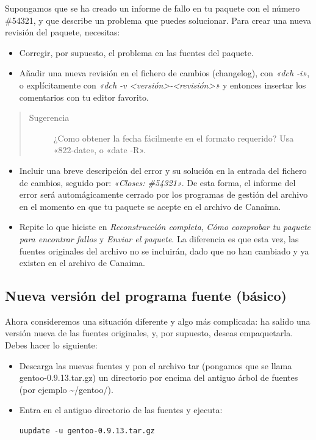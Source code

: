 \documentclass[letterpaper,12pt,spanish]{manual}
\begin{document}
Supongamos que se ha creado un informe de fallo en tu paquete con el número \#54321, y que describe un problema que puedes solucionar. Para crear una nueva revisión del paquete, necesitas:
\begin{itemize}
\item {} 
Corregir, por supuesto, el problema en las fuentes del paquete.

\item {} 
Añadir una nueva revisión en el fichero de cambios (changelog), con \emph{«dch -i»}, o explícitamente con \emph{«dch -v \textless{}versión\textgreater{}-\textless{}revisión\textgreater{}»} y entonces insertar los comentarios con tu editor favorito.

\end{itemize}
\begin{quote}\begin{description}
\item[{Sugerencia}] \leavevmode
¿Como obtener la fecha fácilmente en el formato requerido? Usa «822-date», o «date -R».

\end{description}\end{quote}
\begin{itemize}
\item {} 
Incluir una breve descripción del error y su solución en la entrada del fichero de cambios, seguido por: \emph{«Closes: \#54321»}. De esta forma, el informe del error será automágicamente cerrado por los programas de gestión del archivo en el momento en que tu paquete se acepte en el archivo de Canaima.

\item {} 
Repite lo que hiciste en \emph{Reconstrucción completa}, \emph{Cómo comprobar tu paquete para encontrar fallos} y \emph{Enviar el paquete}. La diferencia es que esta vez, las fuentes originales del archivo no se incluirán, dado que no han cambiado y ya existen en el archivo de Canaima.

\end{itemize}


\subsection{Nueva versión del programa fuente (básico)}

Ahora consideremos una situación diferente y algo más complicada: ha salido una versión nueva de las fuentes originales, y, por supuesto, deseas empaquetarla. Debes hacer lo siguiente:
\begin{itemize}
\item {} 
Descarga las nuevas fuentes y pon el archivo tar (pongamos que se llama gentoo-0.9.13.tar.gz) un directorio por encima del antiguo árbol de fuentes (por ejemplo \textasciitilde{}/gentoo/).

\item {} 
Entra en el antiguo directorio de las fuentes y ejecuta:

\begin{Verbatim}[commandchars=@\[\]]
uupdate -u gentoo-0.9.13.tar.gz
\end{Verbatim}

\end{itemize}
\end{document}
